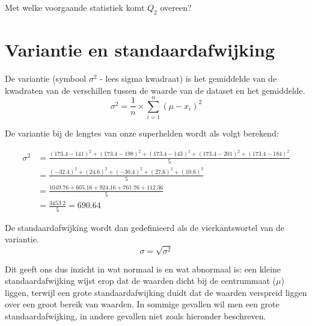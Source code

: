 \begin{exercise}
  Met welke voorgaande statistiek komt $Q_{2}$ overeen?
\end{exercise}

\section{Variantie en standaardafwijking}
\label{sec:varEnSD}
\begin{definition}[Variantie]
  De  variantie (symbool $\sigma^{2}$ - lees sigma kwadraat) is het gemiddelde van de kwadraten van de verschillen tussen de waarde van de dataset en het gemiddelde.
  \begin{equation}
    \sigma^{2} = \frac{1}{n} \times \sum_{i=1}^{n} \left( \mu - x_i \right)^{2}
    \label{eq:variantie}
  \end{equation}
\end{definition}


\begin{example}
  De variantie bij de lengtes van onze superhelden wordt als volgt berekend:

  \begin{equation}
    \begin{aligned}
      \sigma^{2} &=  \frac{(173.4-141)^{2} + (173.4 - 198 )^{2} + (173.4 - 143)^{2} + (173.4- 201)^{2} + (173.4  -184 )^{2}}{5} \\
      &=  \frac{(-32.4)^{2}+	(24.6)^{2}	+ (-30.4)^{2}+	(27.6)^{2}	+ (10.6)^{2}}{5}\\
      &= \frac{1049.76 + 	605.16	 + 924.16	 + 761.76 + 	112.36}{5}\\
      &= \frac{3453.2}{5} = 690.64
    \end{aligned}
  \end{equation}
\end{example}

\begin{definition}[Standaardafwijking]
  De  standaardafwijking wordt dan gedefinieerd als de vierkantswortel van de variantie.
  \begin{equation}
    \sigma = \sqrt{\sigma^{2}}
    \label{eq:stdev}
  \end{equation}
\end{definition}


Dit geeft ons dus inzicht in wat normaal is en wat abnormaal is: een kleine standaardafwijking wijst erop dat de waarden dicht bij de centrummaat ($\mu$) liggen, terwijl een grote standaardafwijking duidt dat de waarden verspreid liggen over een groot bereik van waarden. In sommige gevallen wil men een grote standaardafwijking, in andere gevallen niet zoals hieronder beschreven.

